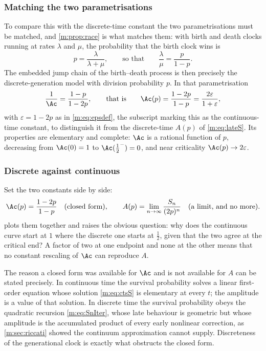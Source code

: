 \subsubsection*{Matching the two parametrisations}

To compare this with the discrete-time constant the two parametrisations must be
matched, and \cref{m:prop:race} is what matches them: with birth and death clocks
running at rates $\lambda$ and $\mu$, the probability that the birth clock wins is
\begin{equation}
\label{m:eq:pfromrates}
p = \frac{\lambda}{\lambda+\mu},
\qquad\text{so that}\qquad
\frac{\lambda}{\mu} = \frac{p}{1-p} .
\end{equation}
The embedded jump chain of the birth--death process is then precisely the
discrete-generation model with division probability $p$. In that parametrisation
\begin{equation}
\label{m:eq:Acts}
\frac{1}{\Ac} = \frac{1-p}{1-2p},
\qquad\text{that is}\qquad
\Ac(p) = \frac{1-2p}{1-p} = \frac{2\varepsilon}{1+\varepsilon},
\end{equation}
with $\varepsilon=1-2p$ as in \cref{m:eq:epsdef}, the subscript marking this as the
continuous-time constant, to distinguish it from the discrete-time $A(p)$ of
\cref{m:eq:lateS}. Its properties are elementary and complete: $\Ac$ is a rational
function of $p$, decreasing from $\Ac(0)=1$ to $\Ac(\tfrac12^-)=0$, and near
criticality $\Ac(p)\to2\varepsilon$.

\subsubsection*{Discrete against continuous}

Set the two constants side by side:
\begin{equation}
\label{m:eq:twoconstants}
\Ac(p) = \frac{1-2p}{1-p}\quad\text{(closed form)},
\qquad
A(p) = \lim_{n\to\infty}\frac{S_n}{(2p)^n}\quad\text{(a limit, and no more)} .
\end{equation}
 plots them together and raises the obvious question: why does the
continuous curve start at $1$ where the discrete one starts at $\tfrac12$, given
that the two agree at the critical end? A factor of two at one endpoint and none at
the other means that no constant rescaling of $\Ac$ can reproduce $A$.

The reason a closed form was available for $\Ac$ and is not available for $A$ can
be stated precisely. In continuous time the survival probability solves a linear
first-order equation whose solution \cref{m:eq:ctsS} is elementary at every $t$; the
amplitude is a value of that solution. In discrete time the survival probability
obeys the quadratic recursion \cref{m:eq:SnIter}, whose late behaviour is geometric
but whose amplitude is the accumulated product of every early nonlinear correction,
as \cref{m:sec:riccati} showed the continuum approximation cannot supply. Discreteness
of the generational clock is exactly what obstructs the closed form.

